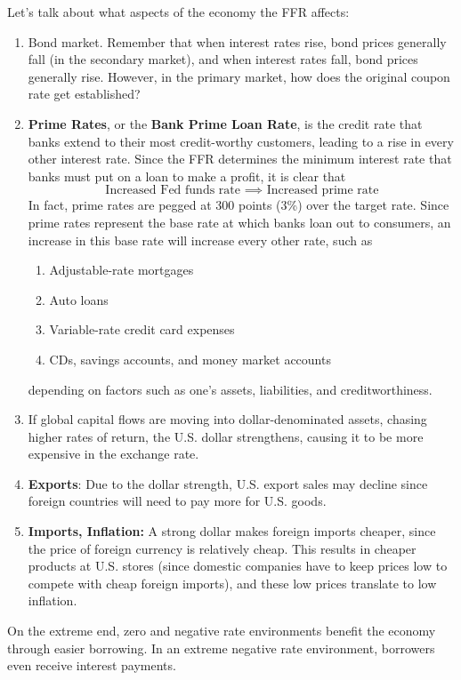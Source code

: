 \documentclass{article}
\begin{document}
    Let's talk about what aspects of the economy the FFR affects: 
    \begin{enumerate}
      \item Bond market. Remember that when interest rates rise, bond prices generally fall (in the secondary market), and when interest rates fall, bond prices generally rise. However, in the primary market, how does the original coupon rate get established? 
      
      \item \textbf{Prime Rates}, or the \textbf{Bank Prime Loan Rate}, is the credit rate that banks extend to their most credit-worthy customers, leading to a rise in every other interest rate. Since the FFR determines the minimum interest rate that banks must put on a loan to make a profit, it is clear that 
      \[\text{Increased Fed funds rate } \implies \text{ Increased prime rate}\]
      In fact, prime rates are pegged at 300 points (3\%) over the target rate. Since prime rates represent the base rate at which banks loan out to consumers, an increase in this base rate will increase every other rate, such as 
      \begin{enumerate}
          \item Adjustable-rate mortgages
          \item Auto loans
          \item Variable-rate credit card expenses
          \item CDs, savings accounts, and money market accounts
      \end{enumerate}
      depending on factors such as one's assets, liabilities, and creditworthiness. 
      \item If global capital flows are moving into dollar-denominated assets, chasing higher rates of return, the U.S. dollar strengthens, causing it to be more expensive in the exchange rate. 
      \item \textbf{Exports}: Due to the dollar strength, U.S. export sales may decline since foreign countries will need to pay more for U.S. goods. 
      \item \textbf{Imports, Inflation:} A strong dollar makes foreign imports cheaper, since the price of foreign currency is relatively cheap. This results in cheaper products at U.S. stores (since domestic companies have to keep prices low to compete with cheap foreign imports), and these low prices translate to low inflation. 
    \end{enumerate}
    On the extreme end, zero and negative rate environments benefit the economy through easier borrowing. In an extreme negative rate environment, borrowers even receive interest payments. 
\end{document}
